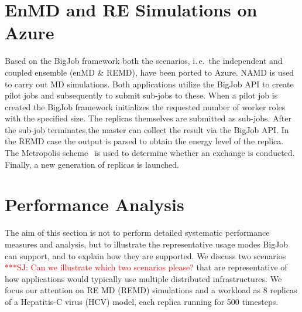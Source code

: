 \documentclass[conference,final]{IEEEtran}
\newcommand{\up}{\vspace*{-1em}}
\newcommand{\numrep}{8 }
\newcommand{\alnote}[1]{ {\textcolor{blue} { ***AL: #1 }}}
\newcommand{\jhanote}[1]{ {\textcolor{red} { ***SJ: #1 }}}
\newcommand{\alnote}[1]{}
\newcommand{\jhanote}[1]{}
\begin{document}
\up
\section{EnMD and RE Simulations on Azure}
\label{sec:enMD-REMD}
\up
Based on the BigJob framework both the scenarios, i.\,e.\ the
independent and coupled ensemble (enMD \& REMD),
have been ported to Azure. NAMD is used to carry out MD simulations.
Both applications utilize the BigJob API to create pilot jobs
and subsequently to submit sub-jobs to these. When a pilot job is
created the BigJob framework initializes the requested number
of worker roles with the specified size. The replicas themselves are submitted as
sub-jobs. 
After the sub-job terminates,the master can collect the result via the BigJob API. 
In the REMD case the output is parsed to obtain the energy level of the replica. 
The Metropolis scheme~\cite{metropolis:1087} is used to determine whether
an exchange is conducted. Finally, a new generation of replicas is launched.



\up
\section{Performance Analysis}
\label{sec:performance}
\up The aim of this section is not to perform detailed systematic
performance measures and analysis, but to illustrate the
representative usage modes BigJob can support, and to explain how they
are supported.  We discuss two scenarios\jhanote{Can we illustrate
  which two scenarios please?} that are representative of how
applications would typically use multiple distributed
infrastructures. We focus our attention on RE MD (REMD) simulations
and a workload as \numrep replicas of a Hepatitis-C virus (HCV) model,
each replica running for 500 timesteps.  \up
\end{document}
